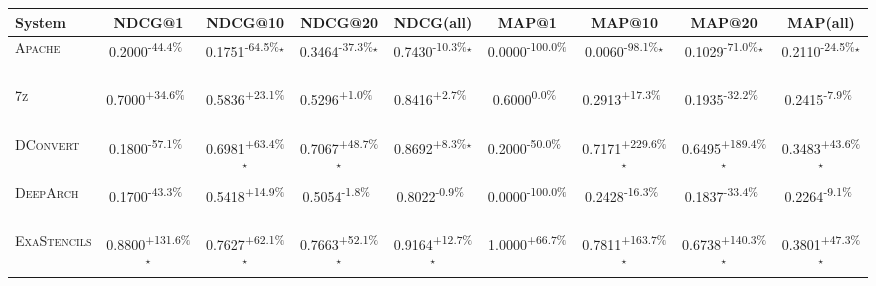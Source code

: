 \begin{table}[htbp]
\centering
\renewcommand{\arraystretch}{1.2}
\begin{tabular}{l|cccc|cccc}
\hline
System & NDCG@1 & NDCG@10 & NDCG@20 & NDCG(all) & MAP@1 & MAP@10 & MAP@20 & MAP(all) \\ \hline
\textsc{Apache} & \cellcolor{red!30}0.2000\textsuperscript{-44.4\%}$^{\,\,\,}$ & \cellcolor{red!30}0.1751\textsuperscript{-64.5\%}$^\star$ & \cellcolor{red!30}0.3464\textsuperscript{-37.3\%}$^\star$ & \cellcolor{red!30}0.7430\textsuperscript{-10.3\%}$^\star$ & \cellcolor{red!30}0.0000\textsuperscript{-100.0\%}$^{\,\,\,}$ & \cellcolor{red!30}0.0060\textsuperscript{-98.1\%}$^\star$ & \cellcolor{red!30}0.1029\textsuperscript{-71.0\%}$^\star$ & \cellcolor{red!30}0.2110\textsuperscript{-24.5\%}$^\star$ \\
\textsc{7z} & \cellcolor{green!30}0.7000\textsuperscript{+34.6\%}$^{\,\,\,}$ & \cellcolor{green!30}0.5836\textsuperscript{+23.1\%}$^{\,\,\,}$ & \cellcolor{green!30}0.5296\textsuperscript{+1.0\%}$^{\,\,\,}$ & \cellcolor{green!30}0.8416\textsuperscript{+2.7\%}$^{\,\,\,}$ & \cellcolor{red!30}0.6000\textsuperscript{0.0\%}$^{\,\,\,}$ & \cellcolor{green!30}0.2913\textsuperscript{+17.3\%}$^{\,\,\,}$ & \cellcolor{red!30}0.1935\textsuperscript{-32.2\%}$^{\,\,\,}$ & \cellcolor{red!30}0.2415\textsuperscript{-7.9\%}$^{\,\,\,}$ \\
\textsc{DConvert} & \cellcolor{red!30}0.1800\textsuperscript{-57.1\%}$^{\,\,\,}$ & \cellcolor{green!30}0.6981\textsuperscript{+63.4\%}$^\star$ & \cellcolor{green!30}0.7067\textsuperscript{+48.7\%}$^\star$ & \cellcolor{green!30}0.8692\textsuperscript{+8.3\%}$^\star$ & \cellcolor{red!30}0.2000\textsuperscript{-50.0\%}$^{\,\,\,}$ & \cellcolor{green!30}0.7171\textsuperscript{+229.6\%}$^\star$ & \cellcolor{green!30}0.6495\textsuperscript{+189.4\%}$^\star$ & \cellcolor{green!30}0.3483\textsuperscript{+43.6\%}$^\star$ \\
\textsc{DeepArch} & \cellcolor{red!30}0.1700\textsuperscript{-43.3\%}$^{\,\,\,}$ & \cellcolor{green!30}0.5418\textsuperscript{+14.9\%}$^{\,\,\,}$ & \cellcolor{red!30}0.5054\textsuperscript{-1.8\%}$^{\,\,\,}$ & \cellcolor{red!30}0.8022\textsuperscript{-0.9\%}$^{\,\,\,}$ & \cellcolor{red!30}0.0000\textsuperscript{-100.0\%}$^{\,\,\,}$ & \cellcolor{red!30}0.2428\textsuperscript{-16.3\%}$^{\,\,\,}$ & \cellcolor{red!30}0.1837\textsuperscript{-33.4\%}$^{\,\,\,}$ & \cellcolor{red!30}0.2264\textsuperscript{-9.1\%}$^{\,\,\,}$ \\
\textsc{ExaStencils} & \cellcolor{green!30}0.8800\textsuperscript{+131.6\%}$^\star$ & \cellcolor{green!30}0.7627\textsuperscript{+62.1\%}$^\star$ & \cellcolor{green!30}0.7663\textsuperscript{+52.1\%}$^\star$ & \cellcolor{green!30}0.9164\textsuperscript{+12.7\%}$^\star$ & \cellcolor{green!30}1.0000\textsuperscript{+66.7\%}$^{\,\,\,}$ & \cellcolor{green!30}0.7811\textsuperscript{+163.7\%}$^\star$ & \cellcolor{green!30}0.6738\textsuperscript{+140.3\%}$^\star$ & \cellcolor{green!30}0.3801\textsuperscript{+47.3\%}$^\star$ \\

\end{tabular}
\end{table}
